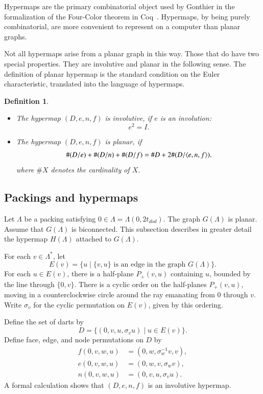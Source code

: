 \documentclass{article} %
\newtheorem{definition}[lemma]{Definition}
\begin{document}
Hypermaps are the primary combinatorial object used by Gonthier in the
formalization of the Four-Color theorem in
Coq~\cite{Gonthier:2005:FourColor}. Hypermaps, by being purely
combinatorial, are more convenient to represent on a computer than
planar graphs.

Not all hypermaps arise from a planar graph in this way.
Those that do have two special properties.  They are involutive
and planar in the following sense.   The definition
of planar hypermap is the standard condition on the Euler
characteristic, translated into the language of hypermaps.

\begin{definition}\label{def:involutive}
\mbox{}
\begin{itemize}
\item The hypermap $(D,e,n,f)$ is involutive, if $e$ is an involution:
$$
 e^2 = I.
$$
\item The hypermap $(D,e,n,f)$ is planar, if
   $$
   \#(D/e) + \#(D/n) + \#(D/f) = \# D + 2\#(D/\langle e,n,f\rangle).
   $$
where $\# X$ denotes the cardinality of $X$.
\end{itemize}
\end{definition}

\subsection{Packings and hypermaps}\label{sec:ph}

Let $\Lambda$ be a packing satisfying $0\in\Lambda=\Lambda(0,2t_{dod})$.  The graph
$G(\Lambda)$ is planar.   Assume that $G(\Lambda)$ is biconnected. 
This subsection describes in greater detail the
hypermap $H(\Lambda)$ attached to $G(\Lambda)$.

For each $v\in \Lambda^*$, let 
  $$E(v) = \{u \mid \{v,u\} \text{ is an edge in the graph } G(\Lambda)\}.$$
For each $u\in E(v)$, there is a half-plane $P_+(v,u)$ containing $u$, bounded by
the line through $\{0,v\}$.  There is a cyclic order on the half-planes $P_+(v,u)$,
moving in a counterclockwise circle around the ray emanating from $0$ through $v$.
Write $\sigma_v$ for the cyclic permutation on $E(v)$, given by this ordering.

Define the set of darts by
$$
D = \{(0,v,u,\sigma_v u) \mid u\in E(v)\}.
$$
Define face, edge, and node permutations on $D$ by
$$
\begin{array}{lll}
  f(0,v,w,u) &= (0,w,\sigma_w^{-1} v,v),\\
  e(0,v,w,u) &= (0,w,v,\sigma_w v),\\
  n(0,v,w,u) &= (0,v,u,\sigma_v u).
\end{array}
$$
A formal calculation shows that $(D,e,n,f)$ is an involutive hypermap.
\end{document}
